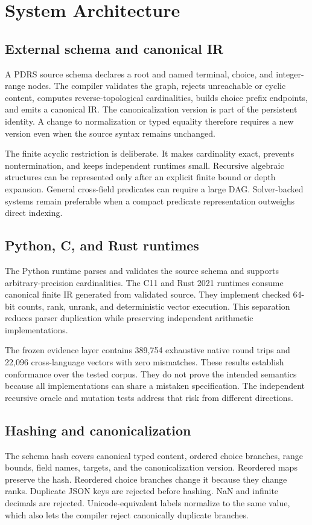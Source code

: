 \section{System Architecture}\label{sec:architecture}
\subsection{External schema and canonical IR}
A PDRS source schema declares a root and named terminal, choice, and integer-range nodes. The compiler validates the graph, rejects unreachable or cyclic content, computes reverse-topological cardinalities, builds choice prefix endpoints, and emits a canonical IR. The canonicalization version is part of the persistent identity. A change to normalization or typed equality therefore requires a new version even when the source syntax remains unchanged.

The finite acyclic restriction is deliberate. It makes cardinality exact, prevents nontermination, and keeps independent runtimes small. Recursive algebraic structures can be represented only after an explicit finite bound or depth expansion. General cross-field predicates can require a large DAG. Solver-backed systems remain preferable when a compact predicate representation outweighs direct indexing.

\subsection{Python, C, and Rust runtimes}
The Python runtime parses and validates the source schema and supports arbitrary-precision cardinalities. The C11 and Rust 2021 runtimes consume canonical finite IR generated from validated source. They implement checked 64-bit counts, rank, unrank, and deterministic vector execution. This separation reduces parser duplication while preserving independent arithmetic implementations.

The frozen evidence layer contains 389,754 exhaustive native round trips and 22,096 cross-language vectors with zero mismatches. These results establish conformance over the tested corpus. They do not prove the intended semantics because all implementations can share a mistaken specification. The independent recursive oracle and mutation tests address that risk from different directions.

\subsection{Hashing and canonicalization}
The schema hash covers canonical typed content, ordered choice branches, range bounds, field names, targets, and the canonicalization version. Reordered maps preserve the hash. Reordered choice branches change it because they change ranks. Duplicate JSON keys are rejected before hashing. NaN and infinite decimals are rejected. Unicode-equivalent labels normalize to the same value, which also lets the compiler reject canonically duplicate branches.


